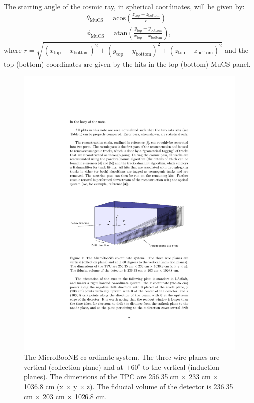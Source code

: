 \documentclass[a4paper]{scrartcl}
\begin{document}
The starting angle of the cosmic ray, in spherical coordinates, will be given by:
\begin{align}
\theta_{\mathrm{MuCS}} = \mathrm{acos}\left(\frac{z_{\mathrm{top}}-z_{\mathrm{bottom}}}{r}\right) \\
\phi_{\mathrm{MuCS}} = \mathrm{atan}\left(\frac{y_{\mathrm{top}}-y_{\mathrm{bottom}}}{x_{\mathrm{top}}-x_{\mathrm{bottom}}}\right),
\end{align}
where $r = \sqrt{(x_{\mathrm{top}}-x_{\mathrm{bottom}})^2+(y_{\mathrm{top}}-y_{\mathrm{bottom}})^2+(z_{\mathrm{top}}-z_{\mathrm{bottom}})^2}$ and the top (bottom) coordinates are given by the hits in the top (bottom) MuCS panel.
 \begin{figure}[htbp]
 \begin{center}
 \includegraphics[width=0.8\linewidth]{figures/coord.pdf}

 \caption{The MicroBooNE co-ordinate system. The three wire planes are vertical (collection plane) and at  $\pm60^{\circ}$ to the vertical (induction planes). The dimensions of the TPC are 256.35 cm $\times$ 233 cm $\times$ 1036.8 cm (x $\times$ y $\times$ z). The fiducial volume of the detector is 236.35 cm $\times$ 203 cm $\times$ 1026.8 cm.} \label{fig:coord}
 \end{center}
 \end{figure}
\end{document}
